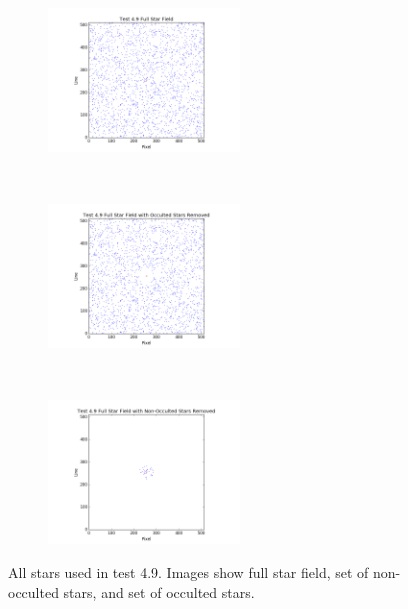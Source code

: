 \documentclass[]{DINOReportMemo}
\begin{document}
\begin{figure}[t!]
    \centering
    \begin{subfigure}
        \centering
        \includegraphics[height=1.5in]{fullNoHole}
    \end{subfigure}%
    ~ 
    \begin{subfigure}
        \centering
        \includegraphics[height=1.5in]{fullWithHole}
    \end{subfigure}
    ~ 
    \begin{subfigure}
        \centering
        \includegraphics[height=1.5in]{fullWithFill}
    \end{subfigure}
    \caption{All stars used in test 4.9. Images show full star field, set of non-occulted stars, and set of occulted stars.}
    \label{512}
\end{figure}
\end{document}
